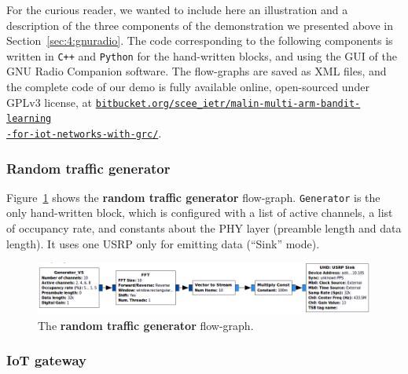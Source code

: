 For the curious reader, we wanted to include here an illustration and a description of the three components of the demonstration we presented above in Section~\ref{sec:4:gnuradio}.
%
The code corresponding to the following components is written in \texttt{C++} and \texttt{Python} for the hand-written blocks, and using the GUI of the GNU Radio Companion software.
The flow-graphs are saved as XML files, and the complete code of our demo is fully available online, open-sourced under GPLv3 license, at
\href{https://bitbucket.org/scee_ietr/malin-multi-arm-bandit-learning-for-iot-networks-with-grc}{\texttt{bitbucket.org/scee\_ietr/malin-multi-arm-bandit-learning}\\\texttt{-for-iot-networks-with-grc/}}.

\subsubsection*{Random traffic generator}

Figure~\ref{fig:4app:USRP_TX_PU__v1__simple_grc} shows the \textbf{random traffic generator} flow-graph.
\texttt{Generator} is the only hand-written block, which is configured with a list of active channels, a list of occupancy rate, and constants about the PHY layer (preamble length and data length). It uses one USRP only for emitting data (``Sink'' mode).

\begin{figure}[!h]
    \includegraphics[width=1.02\textwidth]{2-Chapters/4-Chapter/Images/USRP_TX_PU__v1__simple_grc.png}
    \caption{The \textbf{random traffic generator} flow-graph.}
    \label{fig:4app:USRP_TX_PU__v1__simple_grc}
\end{figure}


\subsubsection*{IoT gateway}

